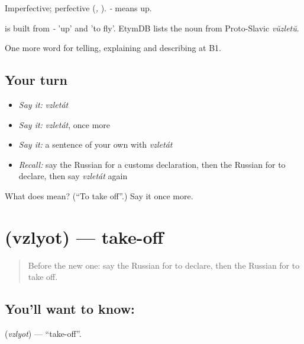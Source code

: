 Imperfective; perfective \emph{} (\emph{, }). \emph{-} means up.

\begin{cousinweb}
\emph{} is built from \emph{-} 'up' and \emph{} 'to fly'. EtymDB lists the noun \emph{} from Proto-Slavic \emph{vŭzletŭ}.
\end{cousinweb}

\begin{grammarlens}[title={What you've built}]
One more word for telling, explaining and describing at B1.
\end{grammarlens}

\subsection*{Your turn}
\begin{itemize}
\raggedright
  \item \emph{Say it:} \emph{vzletát}
  \item \emph{Say it:} \emph{vzletát}, once more
  \item \emph{Say it:} a sentence of your own with \emph{vzletát}
  \item \emph{Recall:} say the Russian for a customs declaration, then the Russian for to declare, then say \emph{vzletát} again
\end{itemize}

\begin{tcolorbox}[breakable,colback=teal!4,colframe=teal!35!black,title={Before you move on}]
What does  mean? (\textquotedblleft{}To take off\textquotedblright{}.) Say it once more.
\end{tcolorbox}
\section[\texorpdfstring{\ru{взлёт} (vzlyot)}{взлёт (vzlyot)}]{ (vzlyot) — take-off}

\label{lesson:RU-C421-vzlyot}



\begin{quote}
Before the new one: say the Russian for to declare, then the Russian for to take off.
\end{quote}

\subsection*{You'll want to know: }
\textbf{} (\emph{vzlyot}) — \textquotedblleft{}take-off\textquotedblright{}.

